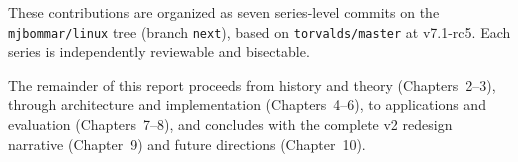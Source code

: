 \noindent
These contributions are organized as seven series-level commits on
the \texttt{mjbommar/linux} tree (branch \texttt{next}), based on
\texttt{torvalds/master} at v7.1-rc5.  Each series is independently
reviewable and bisectable.

\bigskip

The remainder of this report proceeds from history and theory
(Chapters~2--3), through architecture and implementation (Chapters~4--6),
to applications and evaluation (Chapters~7--8), and concludes with
the complete v2 redesign narrative (Chapter~9) and future
directions (Chapter~10).
